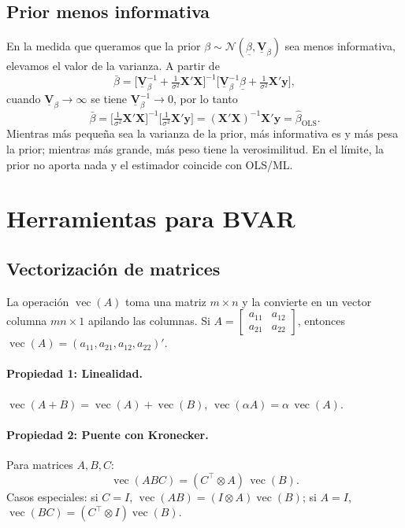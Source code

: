 \documentclass[11pt]{article}
\newcommand{\N}{\mathcal{N}}
\newcommand{\vecop}{\operatorname{vec}}
\newcommand{\bX}{\mathbf{X}}
\newcommand{\by}{\mathbf{y}}
\newcommand{\bV}{\mathbf{V}}
\newcommand{\kron}{\otimes}
\theoremstyle{definition}
\begin{document}
\subsection{Prior menos informativa}
En la medida que queramos que la prior $\beta\sim\N(\underline{\beta},\underline{\bV}_\beta)$ sea menos informativa, elevamos el valor de la varianza. A partir de
\[
\bar\beta=\Big[\underline{\bV}_\beta^{-1}+\tfrac{1}{\sigma^2}\bX'\bX\Big]^{-1}\Big[\underline{\bV}_\beta^{-1}\underline{\beta}+\tfrac{1}{\sigma^2}\bX'\by\Big],
\]
cuando $\underline{\bV}_\beta\to\infty$ se tiene $\underline{\bV}_\beta^{-1}\to 0$, por lo tanto
\[
\bar\beta=\Big[\tfrac{1}{\sigma^2}\bX'\bX\Big]^{-1}\Big[\tfrac{1}{\sigma^2}\bX'\by\Big]=(\bX'\bX)^{-1}\bX'\by=\hat\beta_{\text{OLS}}.
\]
Mientras más pequeña sea la varianza de la prior, más informativa es y más pesa la prior; mientras más grande, más peso tiene la verosimilitud. En el límite, la prior no aporta nada y el estimador coincide con OLS/ML.

\section{Herramientas para BVAR}
\subsection{Vectorización de matrices}
La operación $\vecop(A)$ toma una matriz $m\times n$ y la convierte en un vector columna $mn\times1$ apilando las columnas. Si $A=\begin{bmatrix}a_{11}&a_{12}\\ a_{21}&a_{22}\end{bmatrix}$, entonces $\vecop(A)=(a_{11},a_{21},a_{12},a_{22})'$.

\paragraph{Propiedad 1: Linealidad.}
$\vecop(A+B)=\vecop(A)+\vecop(B)$, \quad $\vecop(\alpha A)=\alpha\,\vecop(A)$.

\paragraph{Propiedad 2: Puente con Kronecker.}
Para matrices $A,B,C$:
\[
\vecop(ABC)=(C^{\top}\kron A)\,\vecop(B).
\]
Casos especiales: si $C=I$, $\vecop(AB)=(I\kron A)\vecop(B)$; si $A=I$, $\vecop(BC)=(C^{\top}\kron I)\vecop(B)$.
\end{document}
